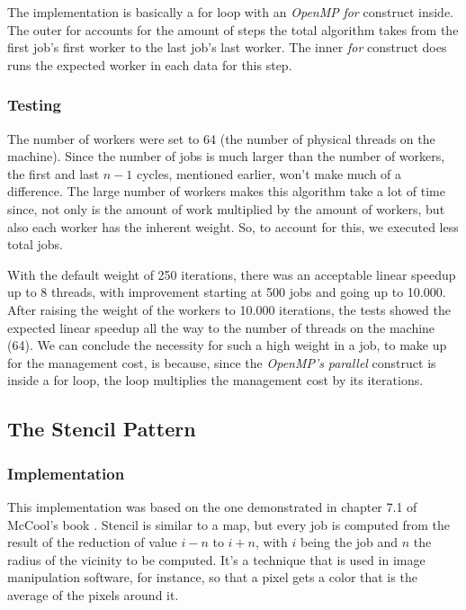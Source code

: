 \documentclass[10pt,journal]{IEEEtran}
\begin{document}
The implementation is basically a for loop with an \textit{OpenMP} \textit{for} construct inside. The outer for accounts for the amount of steps the total algorithm takes from the first job's first worker to the last job's last worker. The inner \textit{for} construct does runs the expected worker in each data for this step.

\subsubsection{Testing}

The number of workers were set to 64 (the number of physical threads on the machine). Since the number of jobs is much larger than the number of workers, the first and last $ n - 1 $ cycles, mentioned earlier, won't make much of a difference. The large number of workers makes this algorithm take a lot of time since, not only is the amount of work multiplied by the amount of workers, but also each worker has the inherent weight. So, to account for this, we executed less total jobs.

With the default weight of 250 iterations, there was an acceptable linear speedup up to 8 threads, with improvement starting at 500 jobs and going up to 10.000. After raising the weight of the workers to 10.000 iterations, the tests showed the expected linear speedup all the way to the number of threads on the machine (64). We can conclude the necessity for such a high weight in a job, to make up for the management cost, is because, since the \textit{OpenMP's} \textit{parallel} construct is inside a for loop, the loop multiplies the management cost by its iterations.

\subsection{The Stencil Pattern}

\subsubsection{Implementation}

This implementation was based on the one demonstrated in chapter 7.1 of McCool's book \cite{mccool}. Stencil is similar to a map, but every job is computed from the result of the reduction of value $ i - n $ to $ i + n $, with $ i $ being the job and $ n $ the radius of the vicinity to be computed. It's a technique that is used in image manipulation software, for instance, so that a pixel gets a color that is the average of the pixels around it.
\end{document}
